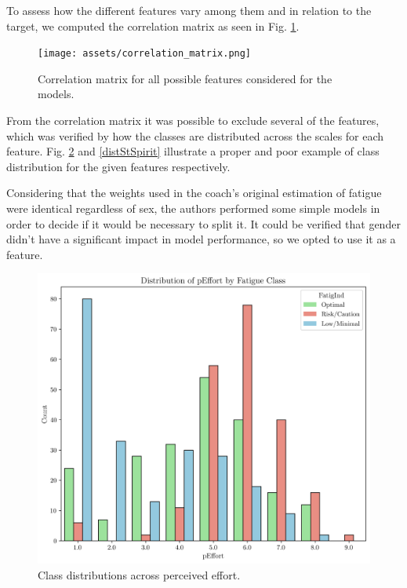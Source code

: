 \documentclass[conference]{IEEEtran}
\begin{document}
To assess how the different features vary among them and in relation to the target, we computed the correlation matrix as seen in Fig. \ref{fig:correlationMatrix}.

\begin{figure}[H]
    \centering
    \texttt{[image: assets/correlation\_matrix.png]}
    \caption{Correlation matrix for all possible features considered for the models.}
    \label{fig:correlationMatrix}
\end{figure} %

From the correlation matrix it was possible to exclude several of the features, which was verified by how the classes are distributed across the scales for each feature. Fig. \ref{distpEffort} and \ref{distStSpirit} illustrate a proper and poor example of class distribution for the given features respectively.

Considering that the weights used in the coach's original estimation of fatigue were identical regardless of sex, the authors performed some simple models in order to decide if it would be necessary to split it. It could be verified that gender didn't have a significant impact in model performance, so we opted to use it as a feature. 

\begin{figure}[H]
    \centering
    \includegraphics[width=1\linewidth]{assets/distribution_pEffort.png}
    \caption{Class distributions across perceived effort.}
    \label{distpEffort}
\end{figure} %
\end{document}

